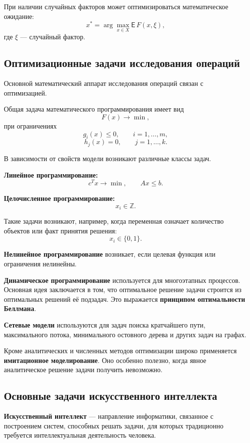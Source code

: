 При наличии случайных факторов может оптимизироваться математическое ожидание:
\[
x^*=\arg\max_{x\in X}\mathsf{E}\,F(x,\xi),
\]
где $\xi$ --- случайный фактор.

\subsection{Оптимизационные задачи исследования операций}

Основной математический аппарат исследования операций связан с оптимизацией.

Общая задача математического программирования имеет вид
\[
F(x)\rightarrow\min,
\]
при ограничениях
\[
g_i(x)\leq 0,\qquad i=1,\ldots,m,
\]
\[
h_j(x)=0,\qquad j=1,\ldots,k.
\]

В зависимости от свойств модели возникают различные классы задач.

\textbf{Линейное программирование:}
\[
c^Tx\rightarrow\min,
\qquad
Ax\leq b.
\]

\textbf{Целочисленное программирование:}
\[
x_i\in\mathbb{Z}.
\]

Такие задачи возникают, например, когда переменная означает количество объектов или факт принятия решения:
\[
x_i\in\{0,1\}.
\]

\textbf{Нелинейное программирование} возникает, если целевая функция или ограничения нелинейны.

\textbf{Динамическое программирование} используется для многоэтапных процессов. Основная идея заключается в том, что оптимальное решение задачи строится из оптимальных решений её подзадач. Это выражается \textbf{принципом оптимальности Беллмана}.

\textbf{Сетевые модели} используются для задач поиска кратчайшего пути, максимального потока, минимального остовного дерева и других задач на графах.

Кроме аналитических и численных методов оптимизации широко применяется \textbf{имитационное моделирование}. Оно особенно полезно, когда явное аналитическое решение задачи получить невозможно.

\subsection{Основные задачи искусственного интеллекта}

\textbf{Искусственный интеллект} --- направление информатики, связанное с построением систем, способных решать задачи, для которых традиционно требуется интеллектуальная деятельность человека.

